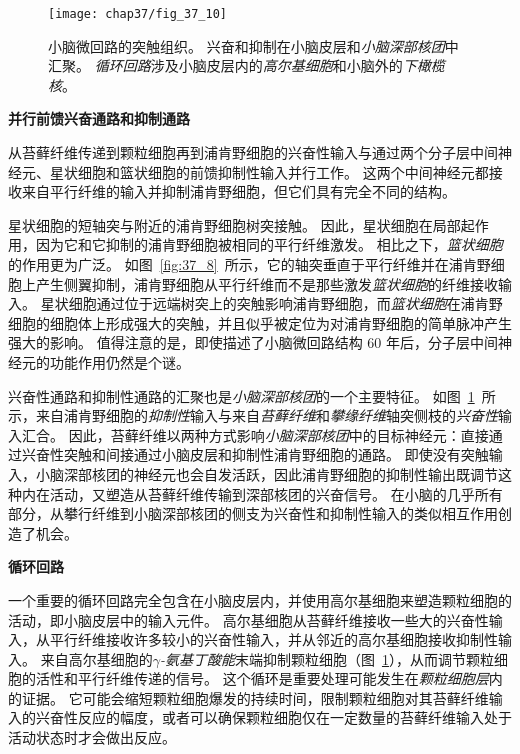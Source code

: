 \begin{figure}[htbp]
	\centering
	\texttt{[image: chap37/fig\_37\_10]}
	\caption{小脑微回路的突触组织。
		兴奋和抑制在小脑皮层和\textit{小脑深部核团}中汇聚。
		\textit{循环回路}涉及小脑皮层内的\textit{高尔基细胞}和小脑外的\textit{下橄榄核}\cite{raymond1996cerebellum}。}
	\label{fig:37_10}
\end{figure}


\textbf{并行前馈兴奋通路和抑制通路}


从苔藓纤维传递到颗粒细胞再到浦肯野细胞的兴奋性输入与通过两个分子层中间神经元、星状细胞和篮状细胞的前馈抑制性输入并行工作。
这两个中间神经元都接收来自平行纤维的输入并抑制浦肯野细胞，但它们具有完全不同的结构。


星状细胞的短轴突与附近的浦肯野细胞树突接触。
因此，星状细胞在局部起作用，因为它和它抑制的浦肯野细胞被相同的平行纤维激发。
相比之下，\textit{篮状细胞}的作用更为广泛。
如图~\ref{fig:37_8}~所示，它的轴突垂直于平行纤维并在浦肯野细胞上产生侧翼抑制，浦肯野细胞从平行纤维而不是那些激发\textit{篮状细胞}的纤维接收输入。
星状细胞通过位于远端树突上的突触影响浦肯野细胞，而\textit{篮状细胞}在浦肯野细胞的细胞体上形成强大的突触，并且似乎被定位为对浦肯野细胞的简单脉冲产生强大的影响。
值得注意的是，即使描述了小脑微回路结构 60 年后，分子层中间神经元的功能作用仍然是个谜。


兴奋性通路和抑制性通路的汇聚也是\textit{小脑深部核团}的一个主要特征。
如图~\ref{fig:37_10}~所示，来自浦肯野细胞的\textit{抑制性}输入与来自\textit{苔藓纤维}和\textit{攀缘纤维}轴突侧枝的\textit{兴奋性}输入汇合。
因此，苔藓纤维以两种方式影响\textit{小脑深部核团}中的目标神经元：直接通过兴奋性突触和间接通过小脑皮层和抑制性浦肯野细胞的通路。
即使没有突触输入，小脑深部核团的神经元也会自发活跃，因此浦肯野细胞的抑制性输出既调节这种内在活动，又塑造从苔藓纤维传输到深部核团的兴奋信号。
在小脑的几乎所有部分，从攀行纤维到小脑深部核团的侧支为兴奋性和抑制性输入的类似相互作用创造了机会。



\textbf{循环回路}

一个重要的循环回路完全包含在小脑皮层内，并使用高尔基细胞来塑造颗粒细胞的活动，即小脑皮层中的输入元件。
高尔基细胞从苔藓纤维接收一些大的兴奋性输入，从平行纤维接收许多较小的兴奋性输入，并从邻近的高尔基细胞接收抑制性输入。
来自高尔基细胞的\textit{$\gamma$-氨基丁酸能}末端抑制颗粒细胞（图~\ref{fig:37_10}），从而调节颗粒细胞的活性和平行纤维传递的信号。
这个循环是重要处理可能发生在\textit{颗粒细胞层}内的证据。
它可能会缩短颗粒细胞爆发的持续时间，限制颗粒细胞对其苔藓纤维输入的兴奋性反应的幅度，或者可以确保颗粒细胞仅在一定数量的苔藓纤维输入处于活动状态时才会做出反应。



